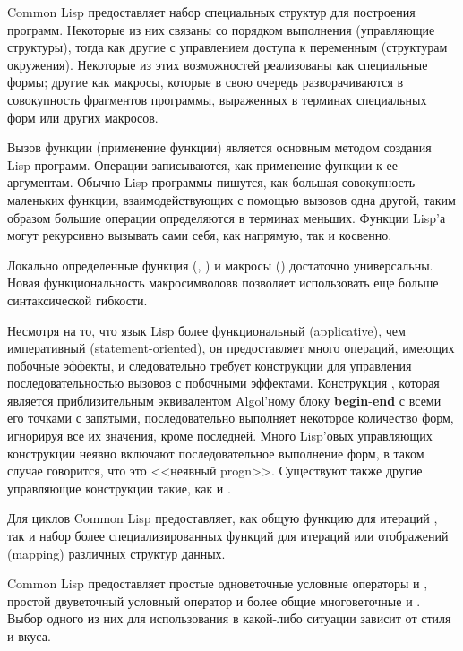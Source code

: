 Common Lisp предоставляет набор специальных структур для построения
программ. Некоторые из них связаны со порядком выполнения (управляющие
структуры), тогда как другие с управлением доступа к переменным (структурам
окружения).
Некоторые из этих возможностей реализованы как специальные формы;
другие как макросы, которые в свою очередь разворачиваются в совокупность
фрагментов программы, выраженных в терминах специальных форм или других
макросов.

Вызов функции (применение функции) является основным методом создания Lisp
программ. Операции записываются, как применение функции к ее аргументам. Обычно
Lisp программы пишутся, как большая совокупность маленьких функции,
взаимодействующих с помощью вызовов одна другой, таким образом большие операции
определяются в терминах меньших.
Функции Lisp'а могут рекурсивно вызывать сами себя, как напрямую, так и косвенно.

\begin{new}
Локально определенные функция (, ) и макросы
() достаточно универсальны.
Новая функциональность макросимволовв позволяет использовать еще больше синтаксической гибкости.
\end{new}


Несмотря на то, что язык Lisp более функциональный (applicative), чем императивный
(statement-oriented), он предоставляет много операций, имеющих побочные эффекты,
и следовательно требует конструкции для управления последовательностью вызовов с
побочными эффектами. Конструкция , которая является приблизительным
эквивалентом Algol'ному блоку \textbf{begin}-\textbf{end} с всеми его точками с
запятыми, последовательно выполняет некоторое количество форм, игнорируя все их
значения, кроме последней.
Много Lisp'овых управляющих конструкции неявно включают последовательное
выполнение форм, в таком случае говорится, что это <<неявный progn>>.
Существуют также другие управляющие конструкции такие, как  и
.

Для циклов Common Lisp предоставляет, как общую функцию для итераций ,
так и набор более специализированных функций для итераций или отображений
(mapping) различных структур данных.

Common Lisp предоставляет простые одноветочные условные операторы  и
, простой двуветочный условный оператор  и более общие
многоветочные  и . Выбор одного из них для использования в
какой-либо ситуации зависит от стиля и вкуса.

